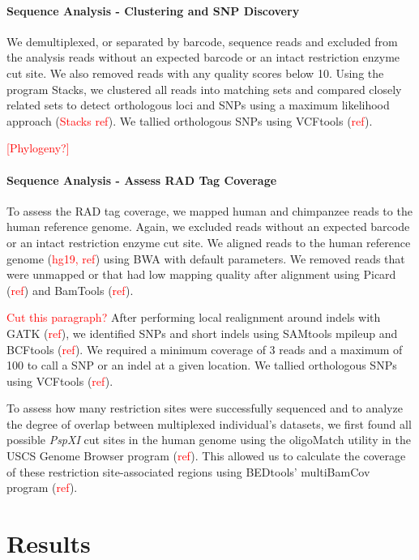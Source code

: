 \documentclass[12pt]{article}
\begin{document}
\paragraph{Sequence Analysis - Clustering and SNP Discovery}

We demultiplexed, or separated by barcode, sequence reads and excluded from the analysis reads without an expected barcode or an intact restriction enzyme cut site. We also removed reads with any quality scores below 10. Using the program Stacks, we clustered all reads into matching sets and compared closely related sets to detect orthologous loci and SNPs using a maximum likelihood approach (\textcolor{red}{Stacks ref}). We tallied orthologous SNPs using VCFtools (\textcolor{red}{ref}).

\textcolor{red}{[Phylogeny?]}

\paragraph{Sequence Analysis - Assess RAD Tag Coverage}

To assess the RAD tag coverage, we mapped human and chimpanzee reads to the human reference genome. Again, we excluded reads without an expected barcode or an intact restriction enzyme cut site. We aligned reads to the human reference genome (\textcolor{red}{hg19, ref}) using BWA with default parameters. We removed reads that were unmapped or that had low mapping quality after alignment using Picard (\textcolor{red}{ref}) and BamTools (\textcolor{red}{ref}). 

\textcolor{red}{Cut this paragraph?} After performing local realignment around indels with GATK (\textcolor{red}{ref}), we identified SNPs and short indels using SAMtools mpileup and BCFtools (\textcolor{red}{ref}). We required a minimum coverage of 3 reads and a maximum of 100 to call a SNP or an indel at a given location. We tallied orthologous SNPs using VCFtools (\textcolor{red}{ref}).
	
To assess how many restriction sites were successfully sequenced and to analyze the degree of overlap between multiplexed individual's datasets, we first found all possible \emph{PspXI} cut sites in the human genome using the oligoMatch utility in the USCS Genome Browser program (\textcolor{red}{ref}). This allowed us to calculate the coverage of these restriction site-associated regions using BEDtools' multiBamCov program (\textcolor{red}{ref}).

\section{Results}
\end{document}

